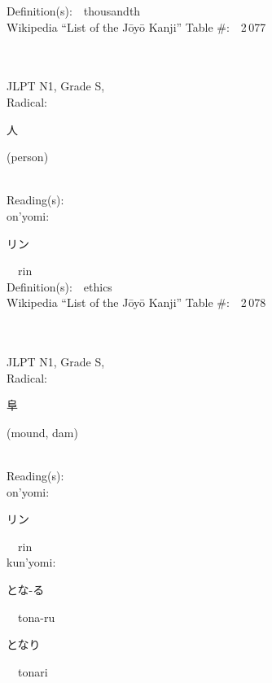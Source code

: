 \begin{multicols}{2}
Definition(s):\ \ thousandth \\
Wikipedia ``List of the J\=oy\=o Kanji'' Table \#:\ \ 2\,077 \\
\ \ \\
{\fontsize{34pt}{40pt}  }\ \ \\
{JLPT N1, Grade S, \\Radical:\ \ {\begin{CJK}{UTF8}{min} 人 \end{CJK}} (person) } \\
Reading(s):\ \ \\
{\hspace*{1em}}on'yomi:\ \ \\
{\hspace*{2em}}{\begin{CJK}{UTF8}{min} リン \end{CJK}}\ \ rin\ \ \\
Definition(s):\ \ ethics \\
Wikipedia ``List of the J\=oy\=o Kanji'' Table \#:\ \ 2\,078 \\
\ \ \\
{\fontsize{34pt}{40pt}  }\ \ \\
{JLPT N1, Grade S, \\Radical:\ \ {\begin{CJK}{UTF8}{min} 阜 \end{CJK}} (mound, dam) } \\
Reading(s):\ \ \\
{\hspace*{1em}}on'yomi:\ \ \\
{\hspace*{2em}}{\begin{CJK}{UTF8}{min} リン \end{CJK}}\ \ rin\ \ \\
{\hspace*{1em}}kun'yomi:\ \ \\
{\hspace*{2em}}{\begin{CJK}{UTF8}{min} とな-る \end{CJK}}\ \ tona-ru\ \ \\
{\hspace*{2em}}{\begin{CJK}{UTF8}{min} となり \end{CJK}}\ \ tonari\ \ \\

\end{multicols}
